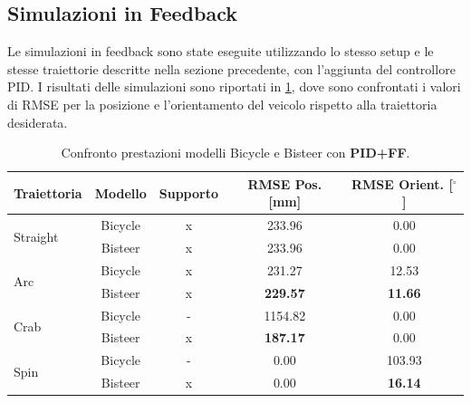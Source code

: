 \subsection{Simulazioni in Feedback}
Le simulazioni in feedback sono state eseguite utilizzando lo stesso setup e le stesse traiettorie descritte nella sezione precedente, con l'aggiunta del controllore PID. I risultati delle simulazioni sono riportati in \cref{tab:pid_summary}, dove sono confrontati i valori di RMSE per la posizione e l'orientamento del veicolo rispetto alla traiettoria desiderata.
\begin{table}[H]
    \centering
    \begin{tabular}{@{}lcccc@{}}
        \toprule
        \textbf{Traiettoria} & \textbf{Modello} & \textbf{Supporto} & \textbf{RMSE Pos. [mm]}      & \textbf{RMSE Orient. [$^\circ$]} \\
        \midrule
        \multirow{2}{*}{Straight}
                             & Bicycle          & x                 & 233.96                       & 0.00                             \\
                             & Bisteer          & x                 & 233.96                       & 0.00                             \\
        \midrule
        \multirow{2}{*}{Arc}
                             & Bicycle          & x                 & 231.27                       & 12.53                            \\
                             & Bisteer          & x                 & \textbf{229.57}              & \textbf{11.66}                   \\
        \midrule
        \multirow{2}{*}{Crab}
                             & Bicycle          & -                 & \textcolor{failure}{1154.82} & 0.00                             \\
                             & Bisteer          & x                 & \textbf{187.17}              & 0.00                             \\
        \midrule
        \multirow{2}{*}{Spin}
                             & Bicycle          & -                 & 0.00                         & \textcolor{failure}{103.93}      \\
                             & Bisteer          & x                 & 0.00                         & \textbf{16.14}                   \\
        \bottomrule
    \end{tabular}
    \caption{Confronto prestazioni modelli Bicycle e Bisteer con \textbf{PID+FF}.}
    \label{tab:pid_summary}
\end{table}
